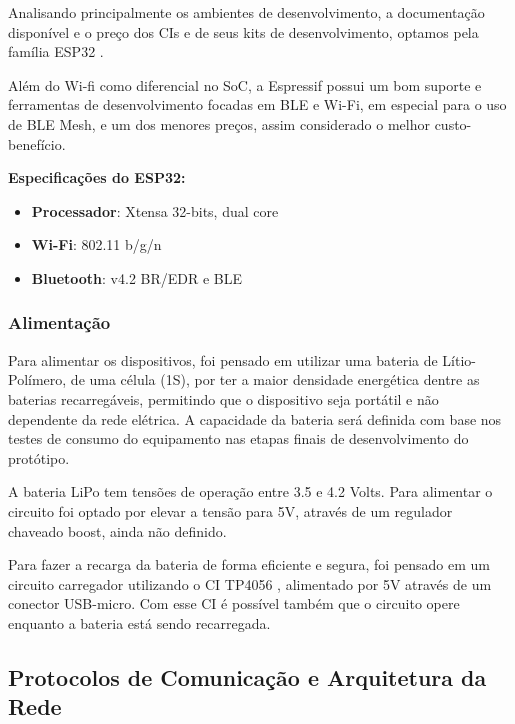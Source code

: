 \documentclass[../monografia.tex]{subfiles}
\begin{document}
Analisando principalmente os ambientes de desenvolvimento, a documentação disponível e o preço dos CIs e de seus kits de desenvolvimento, optamos pela família ESP32 \cite{ESP32}. 

Além do Wi-fi como diferencial no SoC, a Espressif possui um bom suporte e ferramentas de desenvolvimento focadas em BLE e Wi-Fi, em especial para o uso de BLE Mesh, e um dos menores preços, assim considerado o melhor custo-benefício. 

\textbf{Especificações do ESP32:} \cite{ESP-datasheet}
\begin{itemize}
\item \textbf{Processador}: Xtensa 32-bits, dual core
\item \textbf{Wi-Fi}: 802.11 b/g/n
\item \textbf{Bluetooth}: v4.2 BR/EDR e BLE
\end{itemize}



\subsubsection{Alimentação}

Para alimentar os dispositivos, foi pensado em utilizar uma bateria de Lítio-Polímero, de uma célula (1S), por ter a maior densidade energética dentre as baterias recarregáveis, permitindo que o dispositivo seja portátil e não dependente da rede elétrica. A capacidade da bateria será definida com base nos testes de consumo do equipamento nas etapas finais de desenvolvimento do protótipo. 

A bateria LiPo tem tensões de operação entre 3.5 e 4.2 Volts. Para alimentar o circuito foi optado por elevar a tensão para 5V, através de um regulador chaveado boost, ainda não definido. 

Para fazer a recarga da bateria de forma eficiente e segura, foi pensado em um circuito carregador utilizando o CI TP4056 \cite{tp4056}, alimentado por 5V através de um conector USB-micro. Com esse CI é possível também que o circuito opere enquanto a bateria está sendo recarregada. 



\subsection{Protocolos de Comunicação e Arquitetura da Rede}
\end{document}
